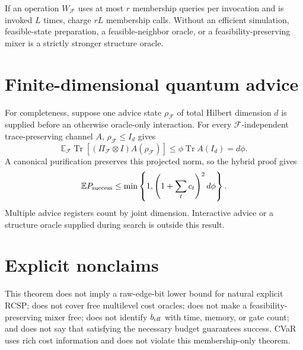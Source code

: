 \documentclass[11pt]{article}
\newcommand{\F}{\mathcal F}
\newcommand{\E}{\mathbb E}
\begin{document}
If an operation $W_{\F}$ uses at most $r$ membership queries per invocation
and is invoked $L$ times, charge $rL$ membership calls.  Without an efficient
simulation, feasible-state preparation, a feasible-neighbor oracle, or a
feasibility-preserving mixer is a strictly stronger structure oracle.

\section{Finite-dimensional quantum advice}
For completeness, suppose one advice state $\rho_{\F}$ of total Hilbert
dimension $d$ is supplied before an otherwise oracle-only interaction.  For
every $\F$-independent trace-preserving channel $A$, $\rho_{\F}\le I_d$ gives
\[
 \E_{\F}\operatorname{Tr}[(\Pi_{\F}\otimes I)A(\rho_{\F})]
 \le\phi\operatorname{Tr}A(I_d)=d\phi.
\]
A canonical purification preserves this projected norm, so the hybrid proof
gives
\[
 \E P_{\rm success}
 \le\min\left\{1,\left(1+\sum_t c_t\right)^2d\phi\right\}.
\]
Multiple advice registers count by joint dimension.  Interactive advice or a
structure oracle supplied during search is outside this result.

\section{Explicit nonclaims}
This theorem does not imply a raw-edge-bit lower bound for natural explicit
RCSP; does not cover free multilevel cost oracles; does not make a
feasibility-preserving mixer free; does not identify $b_{\rm eff}$ with time,
memory, or gate count; and does not say that satisfying the necessary budget
guarantees success.  CVaR uses rich cost information and does not violate this
membership-only theorem.
\end{document}
